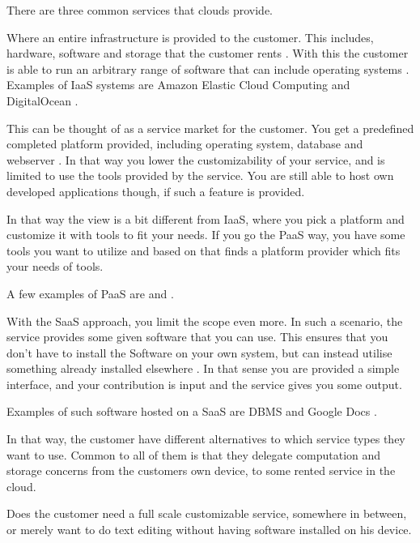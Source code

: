 There are three common services that clouds provide.
\begin{description}[style=nextline]
\item[Infrastructure as a Service (IaaS)]
Where an entire infrastructure is provided to the customer.
This includes, hardware, software and storage that the customer rents \citep{article:mobilecloudreviewinderkilde}.
With this the customer is able to run an arbitrary range of software that can include operating systems \citep{misc:indersuverymcc}.
Examples of IaaS systems are Amazon Elastic Cloud Computing \citep{misc:amazonelastic} and DigitalOcean \citep{misc:digitalocean}.

\item[Platform as a Service (PaaS)]
This can be thought of as a service market for the customer.
You get a predefined completed platform provided, including operating system, database and webserver \cite{article:mobilecloudreviewinderkilde}.
In that way you lower the customizability of your service, and is limited to use the tools provided by the service.
You are still able to host own developed applications though, if such a feature is provided.

In that way the view is a bit different from IaaS, where you pick a platform and customize it with tools to fit your needs.
If you go the PaaS way, you have some tools you want to utilize and based on that finds a platform provider which fits your needs of tools.

A few examples of PaaS are \citet{misc:appFog} and \citet{misc:heroku}.

\item[Software as a Service (SaaS)]
With the SaaS approach, you limit the scope even more.
In such a scenario, the service provides some given software that you can use.
This ensures that you don't have to install the Software on your own system, but can instead utilise something already installed elsewhere \citep{article:mobilecloudreviewinderkilde,misc:indersuverymcc}.
In that sense you are provided a simple interface, and your contribution is input and the service gives you some output.

Examples of such software hosted on a SaaS are DBMS and Google Docs \citep{article:mobilecloudreviewinderkildesecurity}. 
\end{description}
In that way, the customer have different alternatives to which service types they want to use.
Common to all of them is that they delegate computation and storage concerns from the customers own device, to some rented service in the cloud.

Does the customer need a full scale customizable service, somewhere in between, or merely want to do text editing without having software installed on his device.